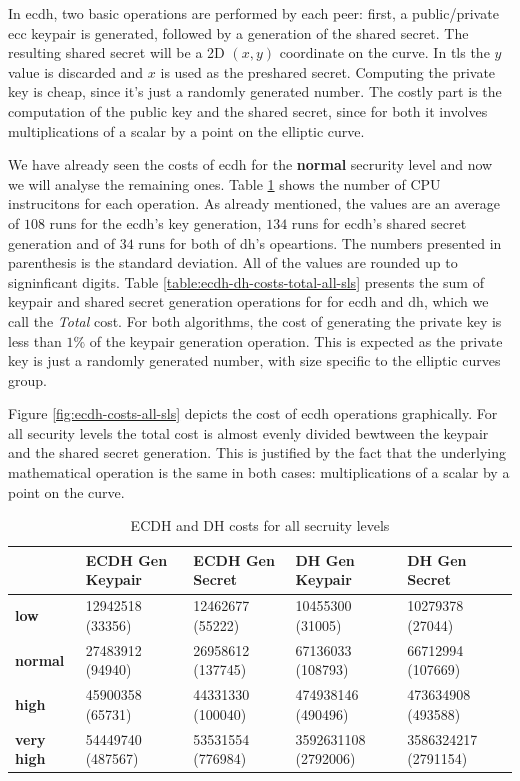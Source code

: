 \documentclass{llncs}
\begin{document}
In \gls{ecdh}, two basic operations are performed by each peer: first, a public/private \gls{ecc} keypair is generated, followed by a generation of
the shared secret. The resulting shared secret will be a 2D $(x,y)$ coordinate on the curve. In \gls{tls} the $y$ value is discarded and $x$ is
used as the preshared secret. Computing the private key is cheap, since it's just a randomly generated number. The costly part is the computation of
the public key and the shared secret, since for both it involves multiplications of a scalar by a point on the elliptic curve.

We have already seen the costs of \gls{ecdh} for the \textbf{normal} secrurity level and now we will analyse the remaining ones. Table
\ref{table:ecdh-dh-costs-all-sls} shows the number of CPU instrucitons for each operation. As already mentioned, the values are an average of
$108$ runs for the \gls{ecdh}'s key generation, $134$ runs for \gls{ecdh}'s shared secret generation and of $34$ runs for both of \gls{dh}'s
opeartions. The numbers presented in parenthesis is the standard deviation. All of the values are rounded up to signinficant digits.
Table \ref{table:ecdh-dh-costs-total-all-sls} presents the sum of keypair and shared secret generation operations for for \gls{ecdh} and \gls{dh},
which we call the \textit{Total} cost. For both algorithms, the cost of generating the private key is less than $1\%$ of the keypair generation operation.
This is expected as the private key is just a randomly generated number, with size specific to the elliptic curves group.

Figure \ref{fig:ecdh-costs-all-sls} depicts the cost of \gls{ecdh} operations graphically. For all security levels the total cost is almost
evenly divided bewtween the keypair and the shared secret generation. This is justified by the fact that the underlying mathematical operation is
the same in both cases: multiplications of a scalar by a point on the curve.

\begin{table}[]
\begin{tabular}{|l|l|l|l|l|}
\hline
                   & \textbf{ECDH Gen Keypair} & \textbf{ECDH Gen Secret} & \textbf{DH Gen Keypair} & \textbf{DH Gen Secret} \\ \hline
\textbf{low}       & 12942518 (33356)          & 12462677 (55222)         & 10455300 (31005)        & 10279378 (27044)       \\ \hline
\textbf{normal}    & 27483912 (94940)          & 26958612 (137745)        & 67136033 (108793)       & 66712994 (107669)      \\ \hline
\textbf{high}      & 45900358 (65731)          & 44331330 (100040)        & 474938146 (490496)      & 473634908 (493588)     \\ \hline
\textbf{very high} & 54449740 (487567)         & 53531554 (776984)        & 3592631108 (2792006)    & 3586324217 (2791154)   \\ \hline
\end{tabular}
\caption{\label{table:ecdh-dh-costs-all-sls} ECDH and DH costs for all secruity levels}
\end{table}
\end{document}
